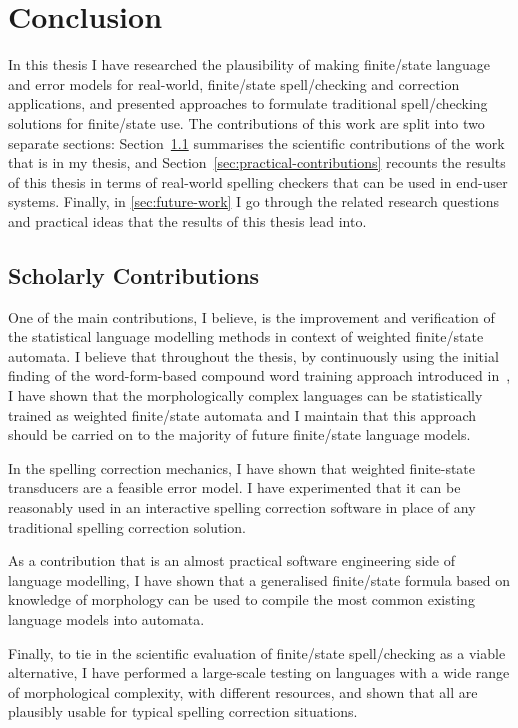 \documentclass[officiallayout]{unihelcompling}
\begin{document}
\chapter{Conclusion}
\label{chap:conclusion}

In this thesis I have researched the plausibility of making finite\-/state
language and error models for real-world, finite\-/state spell\-/checking and
correction applications, and presented approaches to formulate traditional
spell\-/checking solutions for finite\-/state use. The contributions of this
work are split into two separate sections:
Section~\ref{sec:scholarly-contributions} summarises the scientific
contributions of the work that is in my thesis, and
Section~\ref{sec:practical-contributions} recounts the results of this thesis
in terms of real-world spelling checkers that can be used in end-user systems.
Finally, in \ref{sec:future-work} I go through the related research questions
and practical ideas that the results of this thesis lead into.

\section{Scholarly Contributions}
\label{sec:scholarly-contributions}

One of the main contributions, I believe, is the improvement and verification
of the statistical language modelling methods in context of weighted
finite\-/state automata. I believe that throughout the thesis, by continuously
using the initial finding of the word-form-based compound word training
approach introduced in~, I have shown that the
morphologically complex languages can be statistically trained as weighted
finite\-/state automata and I maintain that this approach should be carried on
to the majority of future finite\-/state language models.

In the spelling correction mechanics, I have shown that weighted finite-state
transducers are a feasible error model. I have experimented that it can be
reasonably used in an interactive spelling correction software in place of any
traditional spelling correction solution.


As a contribution that is an almost practical software engineering side of
language modelling, I have shown that a generalised finite\-/state formula based
on knowledge of morphology can be used to compile the most common existing
language models into automata.

Finally, to tie in the scientific evaluation of finite\-/state spell\-/checking
as a viable alternative, I have performed a large-scale testing on languages
with a wide range
of morphological complexity, with different resources, and shown
that all are plausibly usable for typical spelling correction situations.
\end{document}

